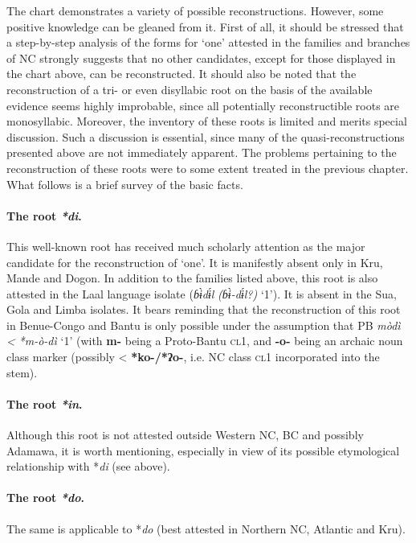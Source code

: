 The chart demonstrates a variety of possible reconstructions. However, some positive knowledge can be gleaned from it. First of all, it should be stressed that a step-by-step analysis of the forms for ‘one’ attested in the families and branches of NC strongly suggests that no other candidates, except for those displayed in the chart above, can be reconstructed. It should also be noted that the reconstruction of a tri- or even disyllabic root on the basis of the available evidence seems highly improbable, since all potentially reconstructible roots are monosyllabic. Moreover, the inventory of these roots is limited and merits special discussion. Such a discussion is essential, since many of the quasi-reconstructions presented above are not immediately apparent. The problems pertaining to the reconstruction of these roots were to some extent treated in the previous chapter. What follows is a brief survey of the basic facts.

\paragraph*{The root \textit{*di}.} This well-known root has received much scholarly attention as the major candidate for the reconstruction of ‘one’. It is manifestly absent only in Kru, Mande and Dogon. In addition to the families listed above, this root is also attested in the Laal language isolate (\textit{ɓ{\`{ɨ}}d{\'{ɨ}}l} \textit{(ɓ{\`{ɨ}}-d{\'{ɨ}}l?)} ‘1’). It is absent in the Sua, Gola and Limba isolates. It bears reminding that the reconstruction of this root in Benue-Congo and Bantu is only possible under the assumption that PB \textit{mòdì} \textit{<} \textit{*m-ò-dì} ‘1’ (with \textbf{m-} being a Proto-Bantu \textsc{cl}1, and \textbf{-}\textbf{o-} being an archaic noun class marker (possibly < \textbf{*ko}\textbf{-/*ʔ}\textbf{o-}, i.e. NC class \textsc{cl}1 incorporated into the stem).

\paragraph*{The root \textit{*in}.} Although this root is not attested outside Western NC, BC and possibly Adamawa, it is worth mentioning, especially in view of its possible etymological relationship with *\textit{di} (see above).

\paragraph*{The root \textit{*do}.}The same is applicable to *\textit{do} (best attested in Northern NC, Atlantic and Kru).

